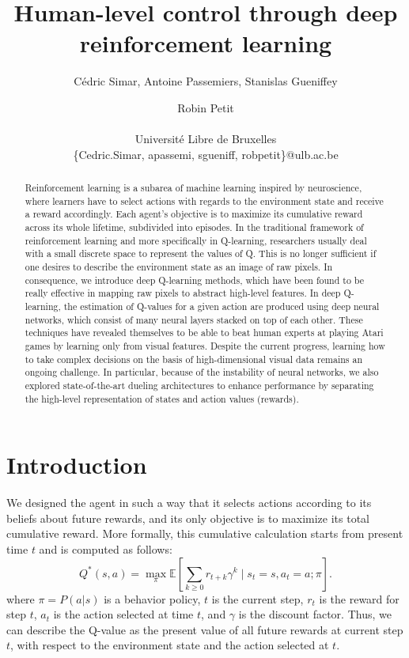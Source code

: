 \documentclass[letterpaper]{article}
\title{Human-level control through deep reinforcement learning}
\author{C\'{e}dric Simar, Antoine Passemiers, Stanislas Gueniffey \and Robin Petit \\
\mbox{}\\
Universit\'{e} Libre de Bruxelles \\
\{Cedric.Simar, apassemi, sgueniff, robpetit\}@ulb.ac.be}
\newcommand{\E}{\mathbb E}
\begin{document}
\maketitle

\begin{abstract}

  Reinforcement learning is a subarea of machine learning inspired by neuroscience, where learners have to select actions with
  regards to the environment state and receive a reward accordingly. Each agent's objective is to maximize its cumulative reward across its whole lifetime,
  subdivided into episodes. In the traditional framework of reinforcement learning and more specifically in Q-learning,
  researchers usually deal with a small discrete space to represent the values of Q. This is no longer sufficient if one desires to describe the environment state
  as an image of raw pixels. In consequence, we introduce deep Q-learning methods, which have been found to be really effective in mapping raw pixels
  to abstract high-level features. In deep Q-learning, the estimation of Q-values for a given action are produced using deep neural networks,
  which consist of many neural layers stacked on top of each other.
  These techniques have revealed themselves to be able to beat human experts at playing Atari games
  by learning only from visual features. Despite the current progress, learning how to take complex decisions on the basis of high-dimensional visual data remains an
  ongoing challenge. In particular, because of the instability of neural networks, we also explored state-of-the-art dueling architectures to enhance performance
  by separating the high-level representation of states and action values (rewards).

\end{abstract}

\section{Introduction}

We designed the agent in such a way that it selects actions according to its beliefs about future rewards, and its only objective is to maximize its total
cumulative reward. More formally, this cumulative calculation starts from present time $t$ and is computed as follows:
\begin{equation}
  Q^{*}(s, a) = \max_{\pi} \E\left[ \sum_{k \geq 0}r_{t+k}\gamma^k \; \big| \; s_t = s, a_t = a; \pi\right].
\end{equation}
where $\pi = P(a | s)$ is a behavior policy, $t$ is the current step, $r_t$ is the reward for step $t$, $a_t$ is the action selected at time $t$,
and $\gamma$ is the discount factor. Thus, we can describe the Q-value as the present value of all future rewards at current step $t$,
with respect to the environment state and the action selected at $t$.
\end{document}
